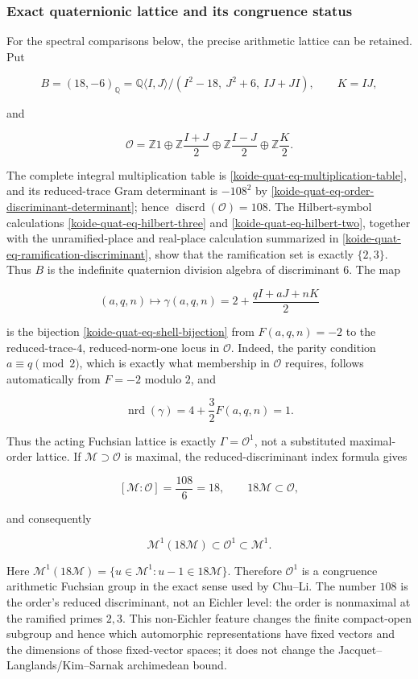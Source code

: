 \subsubsection{Exact quaternionic lattice and its congruence status}\label{koide-lit-exact-quaternionic-lattice-and-its-congruence-status}

For the spectral comparisons below, the precise arithmetic lattice can be retained. Put

\[
 B=(18,-6)_{\mathbb Q}
   =\mathbb Q\langle I,J\rangle/(I^2-18,\ J^2+6,\ IJ+JI),
 \qquad K=IJ,
\]

and

\[
 \mathcal O=\mathbb Z1\oplus
  \mathbb Z\frac{I+J}{2}\oplus
  \mathbb Z\frac{I-J}{2}\oplus
  \mathbb Z\frac K2.
\]

The complete integral multiplication table is
\eqref{koide-quat-eq-multiplication-table}, and its reduced-trace Gram
determinant is \(-108^2\) by
\eqref{koide-quat-eq-order-discriminant-determinant}; hence
\(\operatorname{discrd}(\mathcal O)=108\).  The Hilbert-symbol calculations
\eqref{koide-quat-eq-hilbert-three} and
\eqref{koide-quat-eq-hilbert-two}, together with the unramified-place and
real-place calculation summarized in
\eqref{koide-quat-eq-ramification-discriminant}, show that the ramification
set is exactly \(\{2,3\}\).  Thus \(B\) is the indefinite quaternion
division algebra of discriminant \(6\). The map

\[
 (a,q,n)\longmapsto
 \gamma(a,q,n)=2+\frac{qI+aJ+nK}{2}
\]

is the bijection \eqref{koide-quat-eq-shell-bijection} from
\(F(a,q,n)=-2\) to the reduced-trace-\(4\), reduced-norm-one locus in
\(\mathcal O\). Indeed, the parity condition \(a\equiv q\pmod2\), which is
exactly what membership in \(\mathcal O\) requires, follows automatically
from \(F=-2\) modulo \(2\), and

\[
 \operatorname{nrd}(\gamma)=4+\frac32F(a,q,n)=1.
\]

Thus the acting Fuchsian lattice is exactly \(\Gamma=\mathcal O^1\), not a substituted maximal-order lattice. If \(\mathcal M\supset\mathcal O\) is maximal, the reduced-discriminant index formula gives

\[
 [\mathcal M:\mathcal O]=\frac{108}{6}=18,
 \qquad 18\mathcal M\subset\mathcal O,
\]

and consequently

\[
 \mathcal M^1(18\mathcal M)
 \subset\mathcal O^1\subset\mathcal M^1.
\]

Here
\(\mathcal M^1(18\mathcal M)=\{u\in\mathcal M^1:u-1\in18\mathcal M\}\).
Therefore \(\mathcal O^1\) is a congruence arithmetic Fuchsian group in the
exact sense used by Chu--Li. The number \(108\) is the order's reduced
discriminant, not an Eichler level: the order is nonmaximal at the ramified
primes \(2,3\). This non-Eichler feature changes the finite compact-open
subgroup and hence which automorphic representations have fixed vectors and
the dimensions of those fixed-vector spaces; it does not change the
Jacquet--Langlands/Kim--Sarnak archimedean bound.

